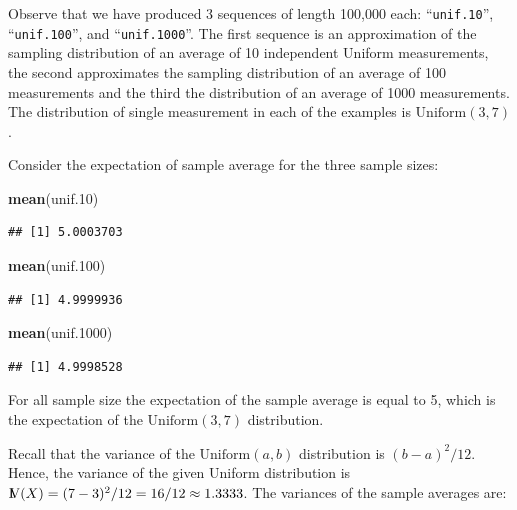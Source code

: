 \documentclass[]{krantz}
\makeatletter
\newenvironment{Shaded}{\begin{snugshade}}{\end{snugshade}}
\newcommand{\FloatTok}[1]{\textcolor[rgb]{0.00,0.00,0.81}{#1}}
\newcommand{\KeywordTok}[1]{\textcolor[rgb]{0.13,0.29,0.53}{\textbf{#1}}}
\newcommand{\NormalTok}[1]{#1}
\newcommand{\Var}{{\rm I\kern-.3em V}}
\newenvironment{kframe}{%
\medskip{}
\setlength{\fboxsep}{.8em}
 \def\at@end@of@kframe{}%
 \ifinner\ifhmode%
  \def\at@end@of@kframe{\end{minipage}}%
  \begin{minipage}{\columnwidth}%
 \fi\fi%
 \def\FrameCommand##1{\hskip\@totalleftmargin \hskip-\fboxsep
 \colorbox{shadecolor}{##1}\hskip-\fboxsep
     \hskip-\linewidth \hskip-\@totalleftmargin \hskip\columnwidth}%
 \MakeFramed {\advance\hsize-\width
   \@totalleftmargin\z@ \linewidth\hsize
   \@setminipage}}%
 {\par\unskip\endMakeFramed%
 \at@end@of@kframe}
\renewenvironment{Shaded}{\begin{kframe}}{\end{kframe}}
\theoremstyle{definition}
\theoremstyle{definition}
\theoremstyle{definition}
\theoremstyle{remark}
\makeatother
\begin{document}
Observe that we have produced 3 sequences of length 100,000 each:
``\texttt{unif.10}'', ``\texttt{unif.100}'', and ``\texttt{unif.1000}''. The first sequence is an
approximation of the sampling distribution of an average of 10
independent Uniform measurements, the second approximates the sampling
distribution of an average of 100 measurements and the third the
distribution of an average of 1000 measurements. The distribution of
single measurement in each of the examples is \(\mathrm{Uniform}(3,7)\).

Consider the expectation of sample average for the three sample sizes:

\begin{Shaded}
\begin{Highlighting}[]
\KeywordTok{mean}\NormalTok{(unif}\FloatTok{.10}\NormalTok{)}
\end{Highlighting}
\end{Shaded}

\begin{verbatim}
## [1] 5.0003703
\end{verbatim}

\begin{Shaded}
\begin{Highlighting}[]
\KeywordTok{mean}\NormalTok{(unif}\FloatTok{.100}\NormalTok{)}
\end{Highlighting}
\end{Shaded}

\begin{verbatim}
## [1] 4.9999936
\end{verbatim}

\begin{Shaded}
\begin{Highlighting}[]
\KeywordTok{mean}\NormalTok{(unif}\FloatTok{.1000}\NormalTok{)}
\end{Highlighting}
\end{Shaded}

\begin{verbatim}
## [1] 4.9998528
\end{verbatim}

For all sample size the expectation of the sample average is equal to 5,
which is the expectation of the \(\mathrm{Uniform}(3,7)\) distribution.

Recall that the variance of the \(\mathrm{Uniform}(a,b)\) distribution is
\((b-a)^2/12\). Hence, the variance of the given Uniform distribution is
\(\Var(X) = (7-3)^2/12 = 16/12 \approx 1.3333\). The variances of the
sample averages are:
\end{document}
